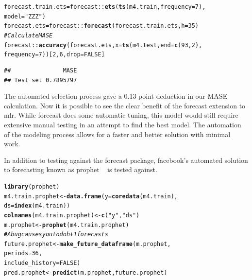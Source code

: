 \documentclass[12pt]{article}\usepackage[]{graphicx}\usepackage[]{color}
\makeatletter
\newcommand{\hlnum}[1]{\textcolor[rgb]{0.686,0.059,0.569}{#1}}%
\newcommand{\hlstr}[1]{\textcolor[rgb]{0.192,0.494,0.8}{#1}}%
\newcommand{\hlcom}[1]{\textcolor[rgb]{0.678,0.584,0.686}{\textit{#1}}}%
\newcommand{\hlopt}[1]{\textcolor[rgb]{0,0,0}{#1}}%
\newcommand{\hlstd}[1]{\textcolor[rgb]{0.345,0.345,0.345}{#1}}%
\newcommand{\hlkwb}[1]{\textcolor[rgb]{0.69,0.353,0.396}{#1}}%
\newcommand{\hlkwc}[1]{\textcolor[rgb]{0.333,0.667,0.333}{#1}}%
\newcommand{\hlkwd}[1]{\textcolor[rgb]{0.737,0.353,0.396}{\textbf{#1}}}%
\newenvironment{kframe}{%
 \def\at@end@of@kframe{}%
 \ifinner\ifhmode%
  \def\at@end@of@kframe{\end{minipage}}%
  \begin{minipage}{\columnwidth}%
 \fi\fi%
 \def\FrameCommand##1{\hskip\@totalleftmargin \hskip-\fboxsep
 \colorbox{shadecolor}{##1}\hskip-\fboxsep
     \hskip-\linewidth \hskip-\@totalleftmargin \hskip\columnwidth}%
 \MakeFramed {\advance\hsize-\width
   \@totalleftmargin\z@ \linewidth\hsize
   \@setminipage}}%
 {\par\unskip\endMakeFramed%
 \at@end@of@kframe}
\newenvironment{knitrout}{}{} %
\theoremstyle{definition}
\newcommand{\pkg}[1]{{\fontseries{b}\selectfont #1}}
\makeatother
\begin{document}
\singlespacing
\begin{knitrout}
\color{fgcolor}\begin{kframe}
\begin{alltt}
\hlstd{forecast.train.ets} \hlkwb{=} \hlstd{forecast}\hlopt{::}\hlkwd{ets}\hlstd{(}\hlkwd{ts}\hlstd{(m4.train,}\hlkwc{frequency} \hlstd{=} \hlnum{7}\hlstd{),}
                                   \hlkwc{model} \hlstd{=} \hlstr{"ZZZ"}\hlstd{)}
\hlstd{forecast.ets} \hlkwb{=} \hlstd{forecast}\hlopt{::}\hlkwd{forecast}\hlstd{(forecast.train.ets,}\hlkwc{h}\hlstd{=}\hlnum{35}\hlstd{)}
\hlcom{# Calculate MASE}
\hlstd{forecast}\hlopt{::}\hlkwd{accuracy}\hlstd{(forecast.ets,} \hlkwc{x}\hlstd{=} \hlkwd{ts}\hlstd{(m4.test,} \hlkwc{end} \hlstd{=} \hlkwd{c}\hlstd{(}\hlnum{93}\hlstd{,}\hlnum{2}\hlstd{),}
                                  \hlkwc{frequency} \hlstd{=} \hlnum{7}\hlstd{))[}\hlnum{2}\hlstd{,}\hlnum{6}\hlstd{,}\hlkwc{drop}\hlstd{=}\hlnum{FALSE}\hlstd{]}
\end{alltt}
\begin{verbatim}
##               MASE
## Test set 0.7895797
\end{verbatim}
\end{kframe}
\end{knitrout}
\doublespacing

The automated selection process gave a 0.13 point deduction in our MASE calculation. Now it is possible to see the clear benefit of the forecast extension to \pkg{mlr}. While \pkg{forecast} does some automatic tuning, this model would still require extensive manual testing in an attempt to find the best model. The automation of the modeling process allows for a faster and better solution with minimal work.

In addition to testing against the \pkg{forecast} package, facebook's automated solution to forecasting known as \pkg{prophet} ~\cite{prophet} is tested against.

\singlespacing
\begin{knitrout}
\color{fgcolor}\begin{kframe}
\begin{alltt}
\hlkwd{library}\hlstd{(prophet)}
\hlstd{m4.train.prophet} \hlkwb{<-} \hlkwd{data.frame}\hlstd{(}\hlkwc{y} \hlstd{=} \hlkwd{coredata}\hlstd{(m4.train),}
                               \hlkwc{ds} \hlstd{=} \hlkwd{index}\hlstd{(m4.train))}
\hlkwd{colnames}\hlstd{(m4.train.prophet)} \hlkwb{<-} \hlkwd{c}\hlstd{(}\hlstr{"y"}\hlstd{,}\hlstr{"ds"}\hlstd{)}
\hlstd{m.prophet} \hlkwb{<-} \hlkwd{prophet}\hlstd{(m4.train.prophet)}
\hlcom{# A bug causes you to do h+1 forecasts}
\hlstd{future.prophet} \hlkwb{<-} \hlkwd{make_future_dataframe}\hlstd{(m.prophet,}
                                        \hlkwc{periods} \hlstd{=} \hlnum{36}\hlstd{,}
                                        \hlkwc{include_history} \hlstd{=}\hlnum{FALSE}\hlstd{)}
\hlstd{pred.prophet} \hlkwb{<-} \hlkwd{predict}\hlstd{(m.prophet, future.prophet)}
\end{alltt}
\end{kframe}
\end{knitrout}
\end{document}

